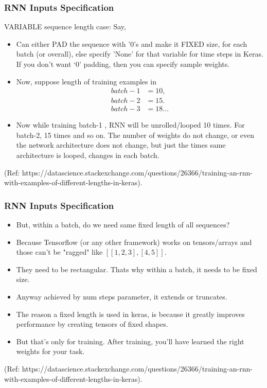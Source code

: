 \begin{frame}[fragile] \frametitle{RNN Inputs Specification}
VARIABLE sequence length case: Say,
\begin{itemize}
\item Can either PAD the sequence with '0's and make it FIXED size, for each batch (or overall), else specify 'None' for that variable for time steps in Keras.  If you don't want `0' padding, then you can specify sample weights. 
\item Now, suppose length of training examples in
\begin{align*}
batch-1 &= 10, \\
batch-2 &= 15. \\
batch-3 &= 18 \ldots
\end{align*}
\item Now while training batch-1 , RNN will be unrolled/looped 10 times. For batch-2, 15 times and so on. The number of weights do not change, or even the network architecture does not change, but just the times same architecture is looped, changes in each batch.
\end{itemize}

{\tiny (Ref: https://datascience.stackexchange.com/questions/26366/training-an-rnn-with-examples-of-different-lengths-in-keras)}.


\end{frame}


\begin{frame}[fragile] \frametitle{RNN Inputs Specification}
\begin{itemize}

\item But, within a batch, do we need same fixed length of all sequences?
\item Because Tensorflow (or any other framework) works on tensors/arrays and those can't be "ragged" like $[[1,2,3],[4,5]]$. 
\item They need to be rectangular. Thats why within a batch, it needs to be fixed size. 
\item Anyway achieved by num steps parameter, it extends or truncates. 
\item The reason a fixed length is used in keras, is because it greatly improves performance by creating tensors of fixed shapes. 
\item But that's only for training. After training, you'll have learned the right weights for your task.
\end{itemize}

{\tiny (Ref: https://datascience.stackexchange.com/questions/26366/training-an-rnn-with-examples-of-different-lengths-in-keras)}.


\end{frame}


